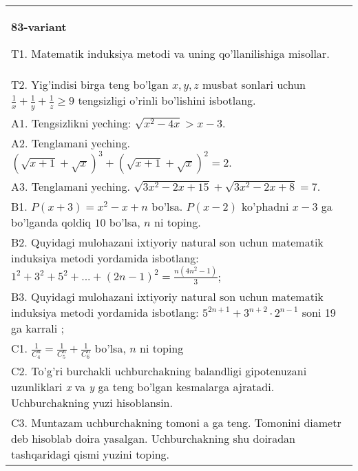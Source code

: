 \documentclass{article}
\begin{document}
\begin{tabular}{m{17cm}}
\textbf{83-variant}
\newline

T1. Matematik induksiya metodi va uning qo'llanilishiga misollar. \\
T2. Yig'indisi birga teng bo'lgan \(x,y,z\) musbat sonlari uchun \(\frac{1}{x} + \frac{1}{y} + \frac{1}{z} \geq 9\) tengsizligi o'rinli bo'lishini isbotlang. \\
A1. Tengsizlikni yeching: \(\sqrt{x^{2} - 4x} > x - 3\). \\
A2. Tenglamani yeching. \((\sqrt{x + 1} + \sqrt{x})^{3} + (\sqrt{x + 1} + \sqrt{x})^{2} = 2\). \\
A3. Tenglamani yeching. \(\sqrt{3x^{2} - 2x + 15} + \sqrt{3x^{2} - 2x + 8} = 7\). \\
B1. \(P(x + 3) = x^{2} - x + n\) bo'lsa. \(P(x - 2)\) ko'phadni \(x - 3\) ga bo'lganda qoldiq \(10\) bo'lsa, \(n\) ni toping. \\
B2. Quyidagi mulohazani ixtiyoriy natural son uchun matematik induksiya metodi yordamida isbotlang: \(1^{2} + 3^{2} + 5^{2} + ... + (2n - 1)^{2} = \frac{n\left( 4n^{2} - 1 \right)}{3}\); \\
B3. Quyidagi mulohazani ixtiyoriy natural son uchun matematik induksiya metodi yordamida isbotlang: \(5^{2n + 1} + 3^{n + 2} \cdot 2^{n - 1}\) soni 19 ga karrali ; \\
C1. \(\frac{1}{C_{4}^{n}} = \frac{1}{C_{5}^{n}} + \frac{1}{C_{6}^{n}}\) bo'lsa, \(n\) ni toping \\
C2. To'g'ri burchakli uchburchakning balandligi gipotenuzani uzunliklari \emph{x} va \emph{y} ga teng bo'lgan kesmalarga ajratadi. Uchburchakning yuzi hisoblansin. \\
C3. Muntazam uchburchakning tomoni a ga teng. Tomonini diametr deb hisoblab doira yasalgan. Uchburchakning shu doiradan tashqaridagi qismi yuzini toping. \\

\end{tabular}
\vspace{1cm}
\end{document}
